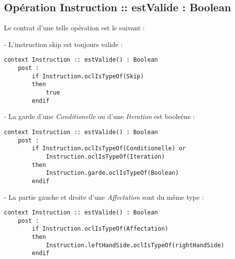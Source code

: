 
\subsection{Opération Instruction :: estValide : Boolean}
\label{sec:question19}

Le contrat d'une telle opération est le suivant :

- L'instruction skip est toujours valide :

\begin{lstlisting}[caption=Contrat \textsc{Ocl} sur l'opération estValide,captionpos=b,label={lst:valide},language=OCL]
context Instruction :: estValide() : Boolean
    post :
        if Instruction.oclIsTypeOf(Skip)
        then
            true
        endif
\end{lstlisting}

- La garde d'une \emph{Conditionelle} ou d'une \emph{Iteration} est booleéne :

\begin{lstlisting}[caption=Contrat \textsc{Ocl} sur la garde,captionpos=b,label={lst:garde},language=OCL]
context Instruction :: estValide() : Boolean
    post :
        if Instruction.oclIsTypeOf(Conditionelle) or
            Instruction.oclIsTypeOf(Iteration)
        then
            Instruction.garde.oclIsTypeOf(Boolean)
        endif
\end{lstlisting}

- La partie gauche et droite d'une \emph{Affectation} sont du même type :

\begin{lstlisting}[caption=Contrat \textsc{Ocl} les parties d'une affectation,captionpos=b,label={lst:parties},language=OCL]
context Instruction :: estValide() : Boolean
    post :
        if Instruction.oclIsTypeOf(Affectation)
        then
            Instruction.leftHandSide.oclIsTypeOf(rightHandSide)
        endif
\end{lstlisting}